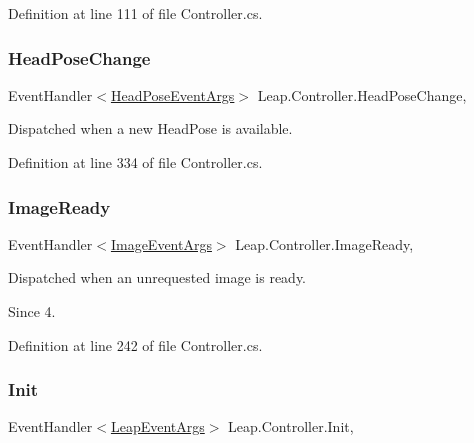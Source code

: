 Definition at line 111 of file Controller.\+cs.

\mbox{\label{class_leap_1_1_controller_a8f102727031288a8b1c8f2583c31d161}} 
\subsubsection{\texorpdfstring{HeadPoseChange}{HeadPoseChange}}
{\footnotesize\ttfamily Event\+Handler$<$\mbox{\hyperlink{class_leap_1_1_head_pose_event_args}{Head\+Pose\+Event\+Args}}$>$ Leap.\+Controller.\+Head\+Pose\+Change\hspace{0.3cm}{\ttfamily [add]}, {\ttfamily [remove]}}



Dispatched when a new Head\+Pose is available. 



Definition at line 334 of file Controller.\+cs.

\mbox{\label{class_leap_1_1_controller_ad76a140483ce708520eb0e940c345a1f}} 
\subsubsection{\texorpdfstring{ImageReady}{ImageReady}}
{\footnotesize\ttfamily Event\+Handler$<$\mbox{\hyperlink{class_leap_1_1_image_event_args}{Image\+Event\+Args}}$>$ Leap.\+Controller.\+Image\+Ready\hspace{0.3cm}{\ttfamily [add]}, {\ttfamily [remove]}}



Dispatched when an unrequested image is ready. 

\begin{DoxySince}{Since}
4. 
\end{DoxySince}


Definition at line 242 of file Controller.\+cs.

\mbox{\label{class_leap_1_1_controller_aeabfa1a25d7aa3724cb786885195e0b2}} 
\subsubsection{\texorpdfstring{Init}{Init}}
{\footnotesize\ttfamily Event\+Handler$<$\mbox{\hyperlink{class_leap_1_1_leap_event_args}{Leap\+Event\+Args}}$>$ Leap.\+Controller.\+Init\hspace{0.3cm}{\ttfamily [add]}, {\ttfamily [remove]}}




